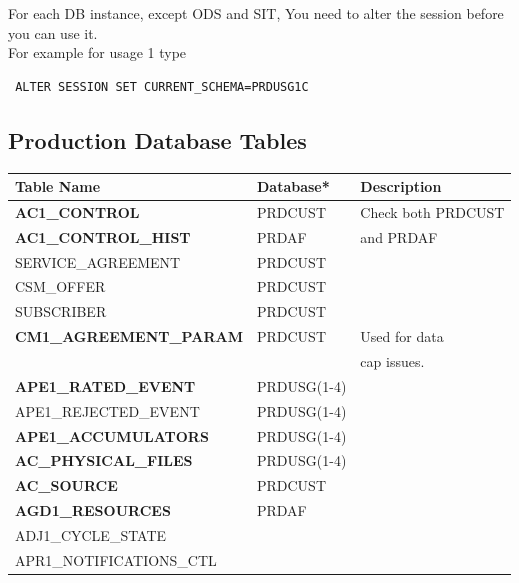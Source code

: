 \documentclass[12pt,twoside]{article}
\begin{document}
   For each DB instance, except ODS and SIT, You need to alter the session before you can use it.\\ For example  for usage 1 type
\begin{verbatim}
 ALTER SESSION SET CURRENT_SCHEMA=PRDUSG1C
\end{verbatim}
\subsection{Production Database Tables}
\label{sec-8-3}

\scriptsize

\begin{center}
\begin{tabular}{lll}
\hline
 \textbf{Table Name}             &  Database*    &  Description                \\
\hline
 \textbf{AC1\_CONTROL}           &  PRDCUST      &  Check both PRDCUST         \\
 \textbf{AC1\_CONTROL\_HIST}     &  PRDAF        &  and PRDAF                  \\
 SERVICE\_AGREEMENT              &  PRDCUST      &                             \\
 CSM\_OFFER                      &  PRDCUST      &                             \\
 SUBSCRIBER                      &  PRDCUST      &                             \\
 \textbf{CM1\_AGREEMENT\_PARAM}  &  PRDCUST      &  Used for data              \\
                                 &               &  cap issues.                \\
 \textbf{APE1\_RATED\_EVENT}     &  PRDUSG(1-4)  &                             \\
 APE1\_REJECTED\_EVENT           &  PRDUSG(1-4)  &                             \\
 \textbf{APE1\_ACCUMULATORS}     &  PRDUSG(1-4)  &                             \\
 \textbf{AC\_PHYSICAL\_FILES}    &  PRDUSG(1-4)  &                             \\
 \textbf{AC\_SOURCE}             &  PRDCUST      &                             \\
 \textbf{AGD1\_RESOURCES}        &  PRDAF        &                             \\
 ADJ1\_CYCLE\_STATE              &               &                             \\
 APR1\_NOTIFICATIONS\_CTL        &               &                             \\

\end{tabular}
\end{center}
\end{document}
